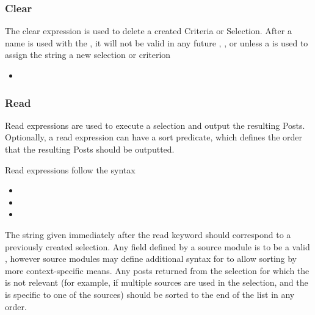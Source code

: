 \subsubsection{Clear}
The clear expression is used to delete a created Criteria or Selection. After a name is used with the
, it will not be valid in any future , , or 
unless a  is used to assign the string a new selection or criterion
\begin{itemize}[leftmargin=2in]
    \item[\nonterminal{clear\_expression}] \bnf{:}  
\end{itemize}

\subsubsection{Read}
Read expressions are used to execute a selection and output the resulting Posts. Optionally, a read
expression can have a sort predicate, which defines the order that the resulting Posts should be outputted.

Read expressions follow the syntax
\begin{itemize}[leftmargin=2in]
    \item[\nonterminal{read\_expression}] \bnf{:}   
    \item[\nonterminal{sort\_predicate}] \bnf{:} \bnf{(} \bnf{|} \bnf{)}   
    \item[\nonterminal{order}] \bnf{:}  \bnf{|} 
\end{itemize}

The string given immediately after the read keyword should correspond to a previously created selection.
Any field defined by a source module is to be a valid , however source modules may define additional
syntax for  to allow sorting by more context-specific means. Any posts returned from the selection
for which the  is not relevant (for example, if multiple sources are used in the selection, and the
 is specific to one of the sources) should be sorted to the end of the list in any order.

